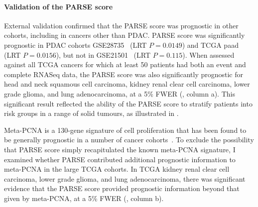 \documentclass[dissertation.tex]{subfiles}
\begin{document}
\paragraph{Validation of the \texorpdfstring{\acrshort{PARSE}}{PARSE} score}
External validation confirmed that the \gls{PARSE} score was prognostic in other cohorts, including in cancers other than \gls{PDAC}.  \Gls{PARSE} score was significantly prognostic in \gls{PDAC} cohorts GSE28735~\cite{Zhang2013} (LRT $P = 0.0149$) and \gls{TCGA} paad (LRT $P = 0.0156$), but not in GSE21501~\cite{Stratford2010} (LRT $P = 0.115$).  When assessed against all \gls{TCGA} cancers for which at least 50 patients had both an event and complete RNASeq data, the \gls{PARSE} score was also significantly prognostic for head and neck squamous cell carcinoma, kidney renal clear cell carcinoma, lower grade glioma, and lung adenocarcinoma, at a 5\% \gls{FWER} (, column a).  This significant result reflected the ability of the \gls{PARSE} score to stratify patients into risk groups in a range of solid tumours, as illustrated in .

Meta-PCNA is a 130-gene signature of cell proliferation that has been found to be generally prognostic in a number of cancer cohorts~\cite{Venet2011}.  To exclude the possibility that \gls{PARSE} score simply recapitulated the known meta-PCNA signature, I examined whether \gls{PARSE} contributed additional prognostic information to meta-PCNA in the large \gls{TCGA} cohorts.  In \gls{TCGA} kidney renal clear cell carcinoma, lower grade glioma, and lung adenocarcinoma, there was significant evidence that the \gls{PARSE} score provided prognostic information beyond that given by meta-PCNA, at a 5\% \gls{FWER} (, column b).
\end{document}
